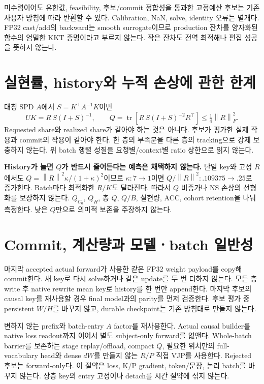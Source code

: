 \documentclass[11pt]{article}
\newcommand{\norm}[1]{\left\lVert #1\right\rVert}
\begin{document}
미수렴이어도 유한값, feasibility, 후보/commit 정합성을 통과한 고정예산 후보는
기존 사용자 방침에 따라 반환할 수 있다. Calibration, NaN, solve, identity 오류는 별개다.
FP32 cast/add의 backward는 smooth surrogate이므로 production 잔차를
양자화된 함수의 엄밀한 KKT 증명이라고 부르지 않는다.
작은 잔차도 전역 최적해나 편집 성공을 뜻하지 않는다.

\section{실현률, history와 누적 손상에 관한 한계}
대칭 SPD $A$에서 $S=K^\top A^{-1}K$이면
\[
 UK=R\,S(I+S)^{-1},\qquad
 Q=\operatorname{tr}[R\,S(I+S)^{-2}R^\top]
 \le \tfrac14\norm{R}_F^2 .
\]
Requested share와 realized share가 같아야 하는 것은 아니다.
후보가 평가한 실제 작용과 commit의 작용이 같아야 한다.
한 층의 부족분을 다른 층의 tracking으로 강제 보충하지 않는다.
위 batch 행렬 성질을 요청별/context별 ratio 상한으로 읽지 않는다.

\textbf{History가 늘면 $Q$가 반드시 줄어든다는 예측은 채택하지 않는다.}
단일 key와 고정 $R$에서도
$Q=\norm{R}^2\kappa/(1+\kappa)^2$이므로
$\kappa:7\to1$이면 $Q/\norm{R}^2:.109375\to.25$로 증가한다.
Batch마다 최적화한 $R/K$도 달라진다.
따라서 $Q$ 비증가나 NS 손상의 선형화를 보장하지 않는다.
$Q_{C_0}$, $Q_H$, 총 $Q$, $Q/B$, 실현량, ACC, cohort retention을 나눠 측정한다.
낮은 $Q$만으로 의미적 보존을 주장하지 않는다.

\section{Commit, 계산량과 모델ㆍbatch 일반성}
마지막 accepted actual forward가 사용한 같은 FP32 weight payload를 copy해 commit한다.
새 key로 다시 solve하거나 같은 update를 두 번 더하지 않는다.
모든 층 write 후 native rewrite mean key로 history를 한 번만 append한다.
마지막 후보의 causal key를 재사용할 경우 final model과의 parity를 먼저 검증한다.
후보 평가 중 persistent $W/H$를 바꾸지 않고,
durable checkpoint는 기존 방침대로 만들지 않는다.

변하지 않는 prefix와 batch-entry $A$ factor를 재사용한다.
Actual causal builder를 native loss readout까지 이어서 별도 subject-only forward를 없앤다.
Whole-batch barrier를 보존하는 stage replay/offload, compact $Q$,
필요한 위치만의 full-vocabulary head와
dense $dW$를 만들지 않는 $R/P$ 직접 VJP를 사용한다.
Rejected 후보는 forward-only다.
이 절약은 loss, K/P gradient, token/문장, 논리 batch를 바꾸지 않는다.
상층 key의 entry 고정이나 detach를 시간 절약에 섞지 않는다.
\end{document}
